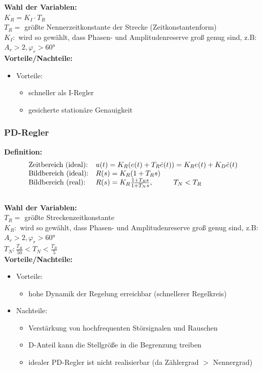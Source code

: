 \documentclass[10pt,a4paper]{article}
\newcommand{\tab}[1][1]{\hspace*{#1cm}}
\begin{document}
\textbf{Wahl der Variablen:} \\
$K_R = K_I ⋅ T_R$ \\
$T_R =$ größte Nennerzeitkonstante der Strecke (Zeitkonstantenform) \\
$K_I:$ wird so gewählt, dass Phasen- und Amplitudenreserve groß genug sind, z.B: $A_r > 2, \varphi_r > 60°$ \\

\textbf{Vorteile/Nachteile:}
\begin{itemize}
	\item Vorteile:
	\begin{itemize}
		\item schneller als I-Regler
		\item gesicherte stationäre Genauigkeit
	\end{itemize}
\end{itemize}


\subsubsection{PD-Regler}
\textbf{Definition:}
$$
	\begin{array}{ll}
	\text{Zeitbereich (ideal):} & u(t) = K_R (e(t) + T_R \dot e(t)) = K_R e(t) + K_D \dot e(t) \\
	\text{Bildbereich (ideal):} & R(s) = K_R(1 + T_R s) \\
	\text{Bildbereich (real):} & R(s) = K_R \frac{1 + T_R s}{1 + T_N s}, \tab T_N < T_R
	\end{array}
$$ \\

\textbf{Wahl der Variablen:} \\
$T_R=$ größte Streckenzeitkonstante  \\
$K_R:$ wird so gewählt, dass Phasen- und Amplitudenreserve groß genug sind, z.B: $A_r > 2, \varphi_r > 60°$ \\
$T_N: \frac{T_R}{50} < T_N < \frac{T_R}{5}$ \\

\textbf{Vorteile/Nachteile:}
\begin{itemize}
	\item Vorteile:
	\begin{itemize}
		\item hohe Dynamik der Regelung erreichbar (schnellerer Regelkreis)
	\end{itemize}
	\item Nachteile:
	\begin{itemize}
		\item Verstärkung von hochfrequenten Störsignalen und Rauschen
		\item D-Anteil kann die Stellgröße in die Begrenzung treiben
		\item idealer PD-Regler ist nicht realisierbar (da Zählergrad $>$ Nennergrad)
	\end{itemize}
\end{itemize}
\end{document}
